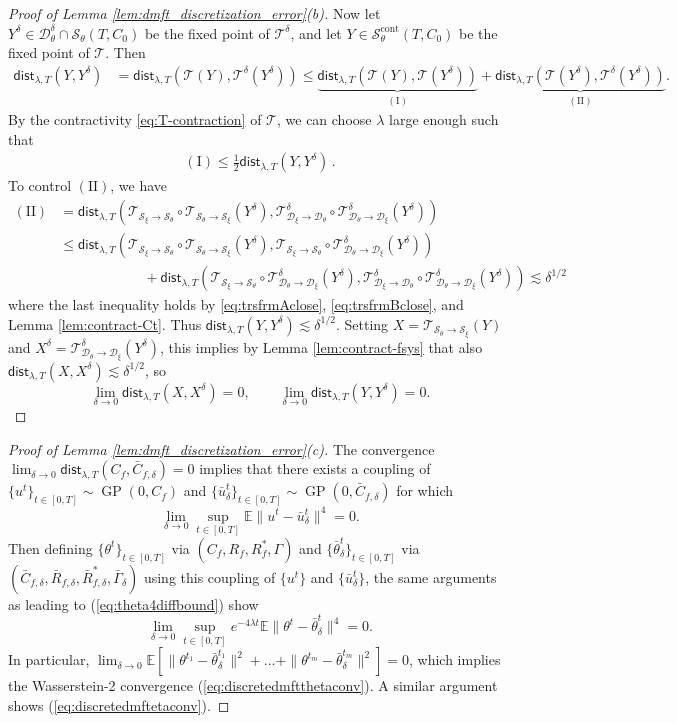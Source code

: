 \documentclass[11pt,letterpaper,reqno]{amsart}
\theoremstyle{definition}
\def\E{\mathbb{E}}
\def\GP{\operatorname{GP}}
\def\cS{\mathcal{S}}
\def\cD{\mathcal{D}}
\def\trsfrm{\mathcal{T}}
\def\trsfrmA{\mathcal{T}_{\mathcal{S}_\xi \to {\mathcal{S}}_\theta}}
\def\trsfrmB{\mathcal{T}_{{\mathcal{S}}_\theta \to \mathcal{S}_\xi}}
\def\trsfrmD{\mathcal{T}^\delta}
\def\trsfrmDA{\mathcal{T}^\delta_{\mathcal{D}_\xi \to {\mathcal{D}}_\theta}}
\def\trsfrmDB{\mathcal{T}^\delta_{{\mathcal{D}}_\theta \to \mathcal{D}_\xi}}
\def\nII{(\mathrm{II})}
\newcommand{\lbddst}[2]{\mathsf{dist}_{\lambda,T}(#1,#2)}
\newcommand{\norm}[1]{\|#1\|}
\begin{document}
\begin{proof}[Proof of Lemma \ref{lem:dmft_discretization_error}(b)]
Now let $Y^\delta \in \cD_\theta^\delta \cap \cS_\theta(T,C_0)$ be the fixed
point of $\trsfrmD$, and let $Y \in \cS_\theta^\text{cont}(T,C_0)$ be the fixed
point of $\trsfrm$. Then
\begin{align*}
	\lbddst{Y}{Y^\delta} & =
\lbddst{\mathcal{T}(Y)}{\mathcal{T}^\delta(Y^\delta)}  \leq
\underbrace{\lbddst{\mathcal{T}(Y)}{\mathcal{T}(Y^\delta)}}_{\mathrm{(I)}} +
\underbrace{\lbddst{\mathcal{T}(Y^\delta)}{
\mathcal{T}^\delta(Y^\delta)}}_{\mathrm{(II)}}.
\end{align*}
By the contractivity \eqref{eq:T-contraction} of $\trsfrm$, we can choose
$\lambda$ large enough such that
\begin{align}
	\mathrm{(I)} \leq \frac 1 2 \lbddst{Y}{Y^\delta} \, . \label{eq:mid-integral-differential-approximation-2}
\end{align}
To control $\mathrm{(II)}$, we have
\begin{align*}
\nII&=\lbddst{\trsfrmA \circ \trsfrmB(Y^\delta)}{\trsfrmDA \circ
\trsfrmDB(Y^\delta)}\\
&\leq \lbddst{\trsfrmA \circ \trsfrmB(Y^\delta)}{\trsfrmA \circ
\trsfrmDB(Y^\delta)}\\
&\hspace{1in}+\lbddst{\trsfrmA \circ \trsfrmDB(Y^\delta)}{\trsfrmDA \circ
\trsfrmDB(Y^\delta)} \lesssim \delta^{1/2}
\end{align*}
where the last inequality holds
by \eqref{eq:trsfrmAclose}, \eqref{eq:trsfrmBclose}, and Lemma
\ref{lem:contract-Ct}. Thus $\lbddst{Y}{Y^\delta} \lesssim \delta^{1/2}$.
Setting $X=\trsfrmB(Y)$ and $X^\delta=\trsfrmDB(Y^\delta)$, this
implies by Lemma \ref{lem:contract-fsys} that also
$\lbddst{X}{X^\delta} \lesssim \delta^{1/2}$, so
\[\lim_{\delta \to 0} \lbddst{X}{X^\delta}=0,
\qquad \lim_{\delta \to 0} \lbddst{Y}{Y^\delta}=0.\]
\end{proof}

\begin{proof}[Proof of Lemma \ref{lem:dmft_discretization_error}(c)]
The convergence $\lim_{\delta\to 0}\lbddst{C_f}{\bar C_{f,\delta}}=0$
implies that there exists a coupling of $\{u^t\}_{t \in [0,T]} \sim
\GP(0,C_f)$ and $\{\bar u^t_\delta\}_{t \in [0,T]} \sim \GP(0,\bar C_{f,\delta})$ for which
\[\lim_{\delta \to 0} \sup_{t \in [0,T]} \E\norm{u^t-\bar u^t_\delta}^4=0.\]
Then defining $\{\theta^t\}_{t \in [0,T]}$ via $(C_f,R_f,R_f^*,\Gamma)$
and $\{\bar \theta_\delta^t\}_{t \in [0,T]}$ via
$(\bar C_{f,\delta},\bar R_{f,\delta},\bar R_{f,\delta}^*,\bar
\Gamma_\delta)$ using this coupling of $\{u^t\}$ and $\{\bar u_\delta^t\}$, the same arguments as leading to (\ref{eq:theta4diffbound}) show
\[\lim_{\delta \to 0} \sup_{t \in [0,T]} e^{-4\lambda t}
\E\norm{\theta^t-\bar \theta^t_\delta}^4=0.\]
In particular,
$\lim_{\delta \to 0} \E[\norm{\theta^{t_1}-\bar
\theta^{t_1}_\delta}^2+\ldots+\norm{\theta^{t_m}-\bar \theta^{t_m}_\delta}^2]
=0$, which implies the Wasserstein-2 convergence
(\ref{eq:discretedmftthetaconv}). A similar argument shows
(\ref{eq:discretedmftetaconv}).
\end{proof}
\end{document}
